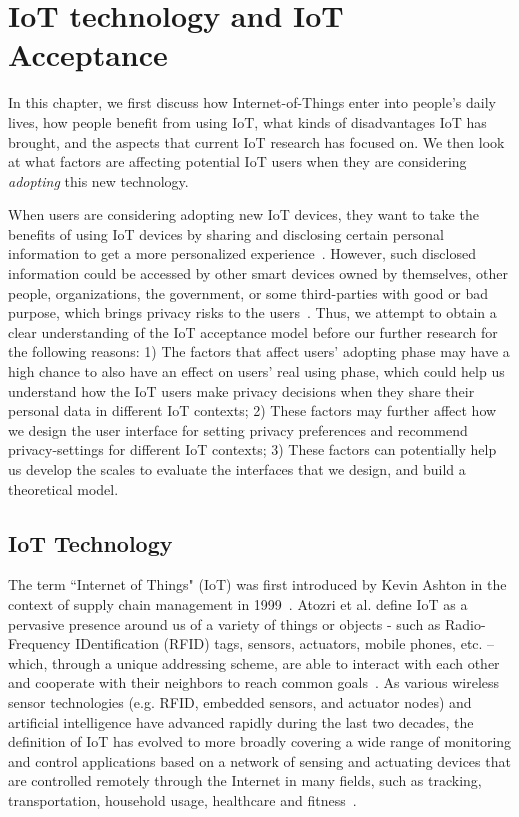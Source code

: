 \chapter{IoT technology and IoT Acceptance}\label{chapter:Relatedwork1}
In this chapter, we first discuss how Internet-of-Things enter into people's daily lives, how people benefit from using IoT, what kinds of disadvantages IoT has brought, and the aspects that current IoT research has focused on. We then look at what factors are affecting potential IoT users when they are considering \textit{adopting} this new technology.

When users are considering adopting new IoT devices, they want to take the benefits of using IoT devices by sharing and disclosing certain personal information to get a more personalized experience~\cite{hemant2015internet}. However, such disclosed information could be accessed by other smart devices owned by themselves, other people, organizations, the government, or some third-parties with good or bad purpose, which brings privacy risks to the users~\cite{medaglia2010overview}. Thus, we attempt to obtain a clear understanding of the IoT acceptance model before our further research for the following reasons: 1) The factors that affect users' adopting phase may have a high chance to also have an effect on users' real using phase, which could help us understand how the IoT users make privacy decisions when they share their personal data in different IoT contexts; 2) These factors may further affect how we design the user interface for setting privacy preferences and recommend privacy-settings for different IoT contexts; 3) These factors can potentially help us develop the scales to evaluate the interfaces that we design, and build a theoretical model.

\section{IoT Technology}
The term ``Internet of Things" (IoT) was first introduced by Kevin Ashton in the context of supply chain management in 1999~\cite{ashton2009internet}. Atozri et al. define IoT as a pervasive presence around us of a variety of things or objects - such as Radio-Frequency IDentification (RFID) tags, sensors, actuators, mobile phones, etc. -- which, through a unique addressing scheme, are able to interact with each other and cooperate with their neighbors to reach common goals~\cite{atzori2010internet}. As various wireless sensor technologies (e.g. RFID, embedded sensors, and actuator nodes) and artificial intelligence have advanced rapidly during the last two decades, the definition of IoT has evolved to more broadly covering a wide range of monitoring and control applications based on a network of sensing and actuating devices that are controlled remotely through the Internet in many fields, such as tracking, transportation, household usage, healthcare and fitness~\cite{li2011smart, solima2016object, kelly2013towards, jia2012rfid, hassanalieragh2015health}.

